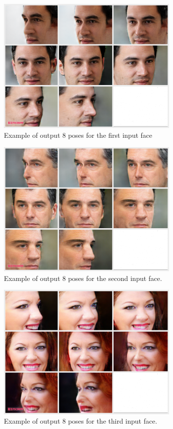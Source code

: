 \begin{itemize}
    \begin{figure}[H]
    \centering
    \includegraphics[width=0.8\textwidth]{images/pose_results/1.png}
    \caption{Example of output 8 poses for the first input face}
    \label{fig:pose_output1}
    \end{figure}
    
    \begin{figure}[H]
    \centering
    \includegraphics[width=0.8\textwidth]{images/pose_results/2.png}
    \caption{Example of output 8 poses for the second input face.}
    \label{fig:pose_output2}
    \end{figure}
    
    \begin{figure}[H]
    \centering
    \includegraphics[width=0.8\textwidth]{images/pose_results/3.png}
    \caption{Example of output 8 poses for the third input face.}
    \label{fig:pose_output3}
    \end{figure}


\end{itemize}
